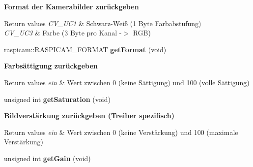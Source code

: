\begin{Indent}{\bf Format der Kamerabilder zurückgeben}\par
{\em 
\begin{DoxyRetVals}{Return values}
{\em C\+V\+\_\+U\+C1} & Schwarz-\/\+Weiß (1 Byte Farbabstufung) \\
\hline
{\em C\+V\+\_\+U\+C3} & Farbe (3 Byte pro Kanal -\/$>$ R\+G\+B) \\
\hline
\end{DoxyRetVals}
}\begin{DoxyCompactItemize}
\item 
\hypertarget{classrc_1_1Camera_aa0cd8c29ec174d184ddcd78084258026}{raspicam\+::\+R\+A\+S\+P\+I\+C\+A\+M\+\_\+\+F\+O\+R\+M\+A\+T {\bfseries get\+Format} (void)}\label{classrc_1_1Camera_aa0cd8c29ec174d184ddcd78084258026}

\end{DoxyCompactItemize}
\end{Indent}
\begin{Indent}{\bf Farbsättigung zurückgeben}\par
{\em 
\begin{DoxyRetVals}{Return values}
{\em ein} & Wert zwischen 0 (keine Sättigung) und 100 (volle Sättigung) \\
\hline
\end{DoxyRetVals}
}\begin{DoxyCompactItemize}
\item 
\hypertarget{classrc_1_1Camera_adf54b48540f83fdcecff277443fbc360}{unsigned int {\bfseries get\+Saturation} (void)}\label{classrc_1_1Camera_adf54b48540f83fdcecff277443fbc360}

\end{DoxyCompactItemize}
\end{Indent}
\begin{Indent}{\bf Bildverstärkung zurückgeben (Treiber spezifisch)}\par
{\em 
\begin{DoxyRetVals}{Return values}
{\em ein} & Wert zwischen 0 (keine Verstärkung) und 100 (maximale Verstärkung) \\
\hline
\end{DoxyRetVals}
}\begin{DoxyCompactItemize}
\item 
\hypertarget{classrc_1_1Camera_aa4f5ffc75180f60ba018f00669bddeee}{unsigned int {\bfseries get\+Gain} (void)}\label{classrc_1_1Camera_aa4f5ffc75180f60ba018f00669bddeee}

\end{DoxyCompactItemize}
\end{Indent}
